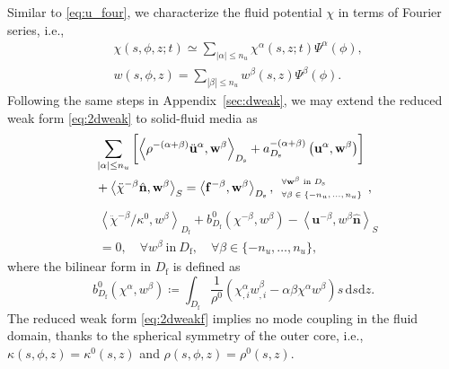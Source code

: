\documentclass[extra,referee]{gji}
\begin{document}
\begin{appendices}
Similar to \eqref{eq:u_four}, we characterize the fluid potential $\chi$
in terms of Fourier series, i.e.,
\begin{align}
  &\chi\left(s,\phi,z;t\right) \simeq \sum_{|\alpha|\le n_u} 
  \chi^\alpha\left(s,z;t\right)\Psi^\alpha\left(\phi\right),\\[.5em]
  &w\left(s,\phi,z\right) =\sum_{|\beta|\le n_u} 
  w^\beta\left(s,z\right)\Psi^\beta\left(\phi\right).
\end{align}
Following the same steps in Appendix~\ref{sec:dweak}, we may extend 
the reduced weak form \eqref{eq:2dweak} to solid-fluid media as
\begin{equation}
  \begin{alignedat}{1}
    &\sum_{|\alpha|\le n_u} \left[ 
    \left\langle \rho^{-\left(\alpha+\beta\right)}
    \ddot{\mathbf{u}}^\alpha,\mathbf{w}^\beta \right\rangle _{D_\text{s}}
    + a_{D_\text{s}}^{-\left(\alpha+\beta\right)}
    \left(\mathbf{u}^\alpha,\mathbf{w}^\beta\right)\right] \\
    &+\left\langle \ddot{\chi}^{-\beta}\hat{\mathbf{n}},
    \mathbf{w}^\beta \right\rangle _{S}
    =\left\langle \mathbf{f}^{-\beta},\mathbf{w}^\beta \right\rangle 
    _{D_\text{s}}, 
    {\scriptsize
    \begin{array}{l}
      \forall \mathbf{w}^\beta\ \text{in}\ D_\text{s} \\[.3em]
      \forall \beta\in \{-n_u,...,n_u\}
    \end{array}
    },
  \end{alignedat}
\end{equation}
\begin{equation}
  \begin{alignedat}{1}
    & \left\langle 
    \ddot{\chi}^{-\beta}\Big/\kappa^{0}, w^\beta
    \right\rangle _{D_\text{f}}
    + b^0_{D_\text{f}}
    \left(\chi^{-\beta},w^\beta\right) 
    -\left\langle \mathbf{u}^{-\beta}, w^\beta \hat{\mathbf{n}}
    \right\rangle _{S}
    \\&=0, \quad \forall w^\beta\ \text{in}\ D_\text{f},
    \quad \forall \beta\in \{-n_u,\dots,n_u\},
  \end{alignedat}
  \label{eq:2dweakf}
\end{equation}
where the bilinear form in $D_\text{f}$ is defined as
\begin{equation}
  b^0_{D_\text{f}}\left(\chi^{\alpha},w^\beta\right) \coloneqq
  \int_{D_\text{f}} \frac{1}{\rho^0}
  \left(\chi^{\alpha}_{,i} w^{\beta}_{,i} -
  \alpha\beta \chi^{\alpha} w^{\beta}\right) s\,\text{d}s\text{d}z.
\end{equation}
The reduced weak form \eqref{eq:2dweakf} implies no mode coupling 
in the fluid domain, thanks to the spherical symmetry of 
the outer core, i.e., 
$\kappa\left(s,\phi,z\right)=\kappa^0\left(s,z\right)$ and $\rho\left(s,\phi,z\right)=\rho^0\left(s,z\right)$.


\end{appendices}
\end{document}
